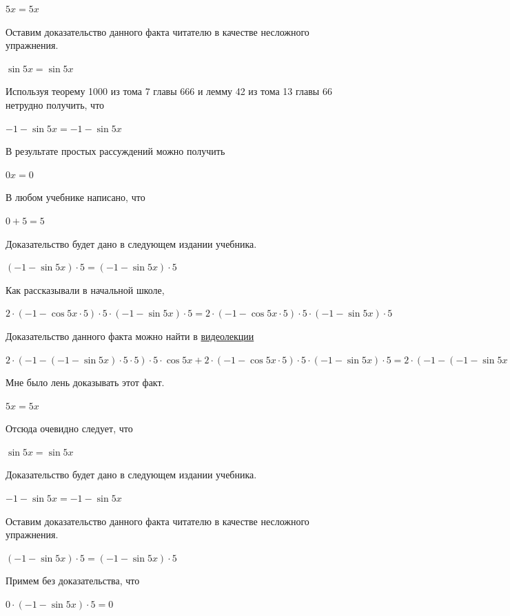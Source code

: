 \documentclass[12pt,a4paper,fleqn]{article}
\theoremstyle{definition}
\begin{document}
$ 5  x  =  5  x $

Оставим доказательство данного факта читателю в качестве несложного упражнения. 

$\sin 5  x  = \sin 5  x $

Используя теорему 1000 из тома 7 главы 666 и лемму 42 из тома 13 главы 66 нетрудно получить, что 

$ -1  - \sin 5  x  =  -1  - \sin 5  x $

В результате простых рассуждений можно получить 

$ 0  x  =  0 $

В любом учебнике написано, что 

$ 0  +  5  =  5 $

Доказательство будет дано в следующем издании учебника. 

$( -1  - \sin 5  x ) \cdot  5  = ( -1  - \sin 5  x ) \cdot  5 $

Как рассказывали в начальной школе, 

$ 2  \cdot ( -1  - \cos 5  x  \cdot  5 ) \cdot  5  \cdot ( -1  - \sin 5  x ) \cdot  5  =  2  \cdot ( -1  - \cos 5  x  \cdot  5 ) \cdot  5  \cdot ( -1  - \sin 5  x ) \cdot  5 $

Доказательство данного факта можно найти в \href{https://www.youtube.com/watch?v=dQw4w9WgXcQ}{видеолекции} 

$ 2  \cdot ( -1  - ( -1  - \sin 5  x ) \cdot  5  \cdot  5 ) \cdot  5  \cdot \cos 5  x  +  2  \cdot ( -1  - \cos 5  x  \cdot  5 ) \cdot  5  \cdot ( -1  - \sin 5  x ) \cdot  5  =  2  \cdot ( -1  - ( -1  - \sin 5  x ) \cdot  5  \cdot  5 ) \cdot  5  \cdot \cos 5  x  +  2  \cdot ( -1  - \cos 5  x  \cdot  5 ) \cdot  5  \cdot ( -1  - \sin 5  x ) \cdot  5 $

Мне было лень доказывать этот факт.

$ 5  x  =  5  x $

Отсюда очевидно следует, что 

$\sin 5  x  = \sin 5  x $

Доказательство будет дано в следующем издании учебника. 

$ -1  - \sin 5  x  =  -1  - \sin 5  x $

Оставим доказательство данного факта читателю в качестве несложного упражнения. 

$( -1  - \sin 5  x ) \cdot  5  = ( -1  - \sin 5  x ) \cdot  5 $

Примем без доказательства, что 

$ 0  \cdot ( -1  - \sin 5  x ) \cdot  5  =  0 $
\end{document}
